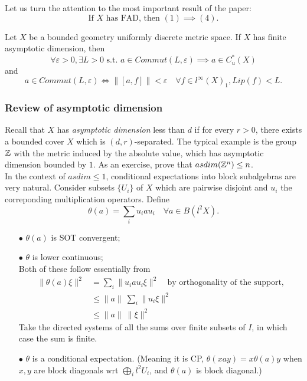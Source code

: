 Let us turn the attention to the most important result of the paper:
\[\text{If }X\text{ has FAD, then }(1)\implies (4).\]

\begin{thm}
Let $X$ be a bounded geometry uniformly discrete metric space. If $X$ has finite asymptotic dimension, then
\[\forall \varepsilon>0, \exists L>0 \text{ s.t. }a\in Commut(L,\varepsilon) \implies a \in C^*_u(X) \] 
and
\[ a\in Commut(L,\varepsilon) \iff \| [a,f] \| <\varepsilon \quad \forall f\in l^\infty(X)_1, Lip(f)< L.\]
\end{thm}

\subsubsection*{Review of asymptotic dimension}

Recall that $X$ has \textit{asymptotic dimension} less than $d$ if for every $r>0$, there exists a bounded cover $X$ which is $(d,r)$-separated. The typical example is the group $\mathbb Z$ with the metric induced by the absolute value, which has asymptotic dimension bounded by $1$. As an exercise, prove that $asdim(\mathbb Z^n) \leq n$.\\

In the context of $asdim \leq 1$, conditional expectations into block subalgebras are very natural. Consider subsets $\{U_i\}$ of $X$ which are pairwise disjoint and $u_i$ the correponding multiplication operators. Define 
\[\theta(a) = \sum_i u_i a u_i \quad \forall a \in B(l^2 X).\]
\begin{itemize}
\item[$\bullet$] $\theta(a)$ is SOT convergent;
\item[$\bullet$] $\theta$ is lower continuous;\\
Both of these follow essentially from
\[\begin{split}
\| \theta(a) \xi\|^2 & = \sum_i \| u_i a u_i \xi \|^2 \quad \text{by orthogonality of the support,} \\
			& \leq \| a \| \ \sum_i \| u_i \xi\|^2 \\
			& \leq \| a \| \ \| \xi\|^2  
\end{split}\]
Take the directed systems of all the sums over finite subsets of $I$, in which case the sum is finite.
\item[$\bullet$] $\theta$ is a conditional expectation. (Meaning it is CP, $\theta(xay)=x\theta(a)y$ when $x,y$ are block diagonals wrt $\bigoplus_i l^2U_i$, and $\theta(a)$ is block diagonal.)
\end{itemize}

